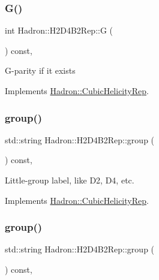 \subsubsection{\texorpdfstring{G()}{G()}\hspace{0.1cm}{\footnotesize\ttfamily [3/3]}}
{\footnotesize\ttfamily int Hadron\+::\+H2\+D4\+B2\+Rep\+::G (\begin{DoxyParamCaption}{ }\end{DoxyParamCaption}) const\hspace{0.3cm}{\ttfamily [inline]}, {\ttfamily [virtual]}}

G-\/parity if it exists 

Implements \mbox{\hyperlink{structHadron_1_1CubicHelicityRep_a50689f42be1e6170aa8cf6ad0597018b}{Hadron\+::\+Cubic\+Helicity\+Rep}}.

\mbox{\label{structHadron_1_1H2D4B2Rep_a48ee68e2c92450c822756a18a840be70}} 
\subsubsection{\texorpdfstring{group()}{group()}\hspace{0.1cm}{\footnotesize\ttfamily [1/5]}}
{\footnotesize\ttfamily std\+::string Hadron\+::\+H2\+D4\+B2\+Rep\+::group (\begin{DoxyParamCaption}{ }\end{DoxyParamCaption}) const\hspace{0.3cm}{\ttfamily [inline]}, {\ttfamily [virtual]}}

Little-\/group label, like D2, D4, etc. 

Implements \mbox{\hyperlink{structHadron_1_1CubicHelicityRep_a101a7d76cd8ccdad0f272db44b766113}{Hadron\+::\+Cubic\+Helicity\+Rep}}.

\mbox{\label{structHadron_1_1H2D4B2Rep_a48ee68e2c92450c822756a18a840be70}} 
\subsubsection{\texorpdfstring{group()}{group()}\hspace{0.1cm}{\footnotesize\ttfamily [2/5]}}
{\footnotesize\ttfamily std\+::string Hadron\+::\+H2\+D4\+B2\+Rep\+::group (\begin{DoxyParamCaption}{ }\end{DoxyParamCaption}) const\hspace{0.3cm}{\ttfamily [inline]}, {\ttfamily [virtual]}}


